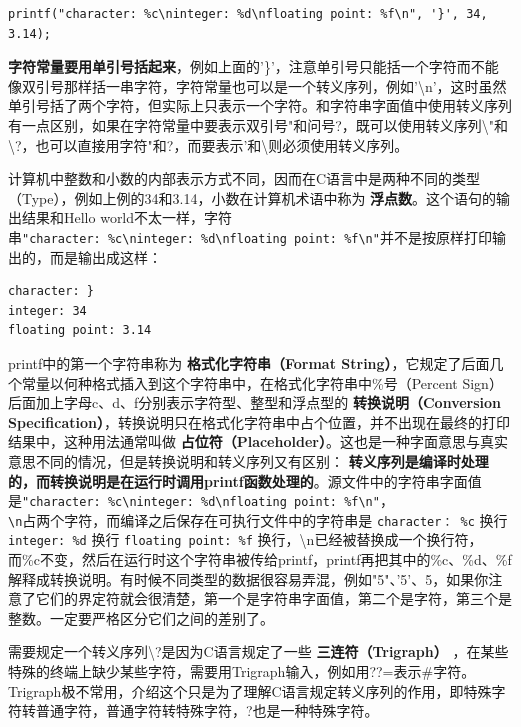 \documentclass[12pt]{book}
\begin{document}
\begin{verbatim}
printf("character: %c\ninteger: %d\nfloating point: %f\n", '}', 34, 3.14);
\end{verbatim}

\textbf{字符常量要用单引号括起来}，例如上面的'\}'，注意单引号只能括一个字符而不能像双引号那样括一串字符，字符常量也可以是一个转义序列，例如'\textbackslash{}n'，这时虽然单引号括了两个字符，但实际上只表示一个字符。和字符串字面值中使用转义序列有一点区别，如果在字符常量中要表示双引号"和问号?，既可以使用转义序列\textbackslash{}"和\textbackslash{}?，也可以直接用字符"和?，而要表示'和\textbackslash{}则必须使用转义序列。

计算机中整数和小数的内部表示方式不同，因而在C语言中是两种不同的类型（Type），例如上例的34和3.14，小数在计算机术语中称为
\textbf{浮点数}。这个语句的输出结果和Hello
world不太一样，字符串\texttt{"character:\ \%c\textbackslash{}ninteger:\ \%d\textbackslash{}nfloating\ point:\ \%f\textbackslash{}n"}并不是按原样打印输出的，而是输出成这样：
\begin{verbatim}
character: }
integer: 34
floating point: 3.14
\end{verbatim}


printf中的第一个字符串称为 \textbf{格式化字符串（Format
String）}，它规定了后面几个常量以何种格式插入到这个字符串中，在格式化字符串中\%号（Percent
Sign）后面加上字母c、d、f分别表示字符型、整型和浮点型的
\textbf{转换说明（Conversion
Specification）}，转换说明只在格式化字符串中占个位置，并不出现在最终的打印结果中，这种用法通常叫做
\textbf{占位符（Placeholder）}。这也是一种字面意思与真实意思不同的情况，但是转换说明和转义序列又有区别：
\textbf{转义序列是编译时处理的，而转换说明是在运行时调用printf函数处理的}。源文件中的字符串字面值是\texttt{"character:\ \%c\textbackslash{}ninteger:\ \%d\textbackslash{}nfloating\ point:\ \%f\textbackslash{}n"}，\\
\texttt{\textbackslash{}n}占两个字符，而编译之后保存在可执行文件中的字符串是
\texttt{character：\ \%c} 换行 \texttt{integer:\ \%d} 换行
\texttt{floating\ point:\ \%f}
换行，\textbackslash n已经被替换成一个换行符，而\%c不变，然后在运行时这个字符串被传给printf，printf再把其中的\%c、\%d、\%f解释成转换说明。有时候不同类型的数据很容易弄混，例如"5"、'5'、5，如果你注意了它们的界定符就会很清楚，第一个是字符串字面值，第二个是字符，第三个是整数。一定要严格区分它们之间的差别了。

需要规定一个转义序列\textbackslash?是因为C语言规定了一些
\textbf{三连符（Trigraph）}
，在某些特殊的终端上缺少某些字符，需要用Trigraph输入，例如用??=表示\#字符。Trigraph极不常用，介绍这个只是为了理解C语言规定转义序列的作用，即特殊字符转普通字符，普通字符转特殊字符，?也是一种特殊字符。
\end{document}
